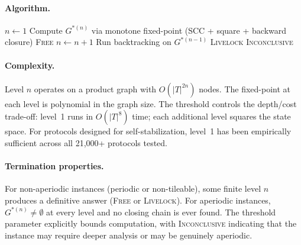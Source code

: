 \documentclass[11pt]{article}
\begin{document}
\paragraph{Algorithm.}

\begin{algorithmic}[1]
\State $n \gets 1$
  \State Compute $G^{*(n)}$ via monotone fixed-point (SCC + square + backward closure)
    \State \Return \textsc{Free} 
  \EndIf
  \State $n \gets n + 1$
\EndWhile
\State Run backtracking on $G^{*(n-1)}$ 
  \State \Return \textsc{Livelock} 
\Else
  \State \Return \textsc{Inconclusive}
\EndIf
\end{algorithmic}

\paragraph{Complexity.} Level $n$ operates on a product graph with $O(|T|^{2n})$ nodes. The fixed-point at each level is polynomial in the graph size. The threshold controls the depth/cost trade-off: level~1 runs in $O(|T|^8)$ time; each additional level squares the state space. For protocols designed for self-stabilization, level~1 has been empirically sufficient across all 21{,}000+ protocols tested.

\paragraph{Termination properties.} For non-aperiodic instances (periodic or non-tileable), some finite level $n$ produces a definitive answer (\textsc{Free} or \textsc{Livelock}). For aperiodic instances, $G^{*(n)} \neq \emptyset$ at every level and no closing chain is ever found. The threshold parameter explicitly bounds computation, with \textsc{Inconclusive} indicating that the instance may require deeper analysis or may be genuinely aperiodic.
\end{document}
